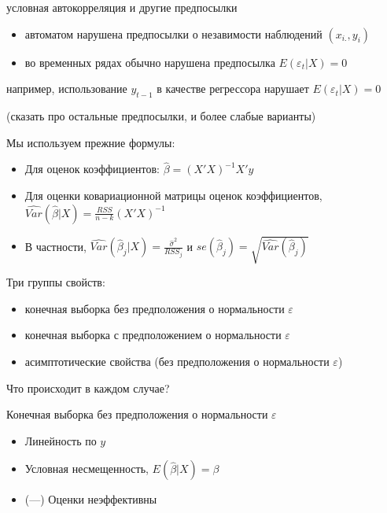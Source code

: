 \documentclass[ignorenonframetext,]{beamer}
\begin{document}
\begin{frame}{условная автокорреляция и другие предпосылки}

\begin{itemize}
\item
  автоматом нарушена предпосылки о незавимости наблюдений
  $(x_{i.}, y_i)$
\item
  во временных рядах обычно нарушена предпосылка
  $E(\varepsilon_t | X)=0$
\end{itemize}

например, использование $y_{t-1}$ в качестве регрессора нарушает
$E(\varepsilon_t | X)=0$

(сказать про остальные предпосылки, и более слабые варианты)

\end{frame}

\begin{frame}{Мы используем прежние формулы:}

\begin{itemize}
\item
  Для оценок коэффициентов: $\hat{\beta}=(X'X)^{-1}X'y$
\item
  Для оценки ковариационной матрицы оценок коэффициентов,
  $\widehat{Var}(\hat{\beta}|X)=\frac{RSS}{n-k}(X'X)^{-1}$
\item
  В частности,
  $\widehat{Var}(\hat{\beta}_j|X)=\frac{\hat{\sigma}^2}{RSS_j}$ и
  $se(\hat{\beta}_j)=\sqrt{\widehat{Var}(\hat{\beta}_j)}$
\end{itemize}

\end{frame}

\begin{frame}{Три группы свойств:}

\begin{itemize}
\item
  конечная выборка без предположения о нормальности $\varepsilon$
\item
  конечная выборка с предположением о нормальности $\varepsilon$
\item
  асимптотические свойства (без предположения о нормальности
  $\varepsilon$)
\end{itemize}

Что происходит в каждом случае?

\end{frame}

\begin{frame}{Конечная выборка без предположения о нормальности
$\varepsilon$}

\begin{itemize}
\item
  Линейность по $y$
\item
  Условная несмещенность, $E(\hat{\beta}|X)=\beta$
\item
  (---) Оценки неэффективны
\end{itemize}

\end{frame}
\end{document}

